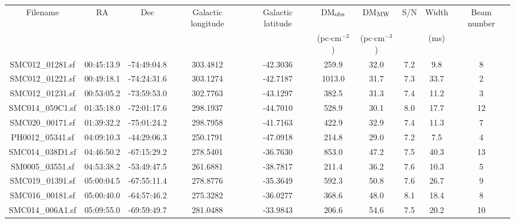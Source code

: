 \documentclass[fleqn,usenatbib]{mnras}
\begin{document}
\begin{table}
\begin{scriptsize}
\begin{center}
\begin{tabular}{@{\extracolsep{\fill}}c|c|c|c|c|c|c|c|c|c}
\multicolumn{1}{c|}{Filename}  &    RA      &  Dec        &     Galactic longitude   	 &     	Galactic latitude        &    DM$_{\rm obs}$        &     DM$_{\rm MW}$       &      S/N       &       	Width         &           Beam number      \\
 \multicolumn{1}{c|}{}            &            &             &                       	     &                                 &     (pc$\cdot$cm$^{-3}$)       &    (pc$\cdot$cm$^{-3}$)        &             &       	(ms)         &                  \\
 \hline
  SMC012\_01281.sf    &   00:45:13.9  &   -74:49:04.8   &    303.4812    &    -42.3036    &    259.9    &    32.0    &    7.2    &    9.8    &    8    \\ 
  SMC012\_01221.sf    &   00:49:18.1  &   -74:24:31.6   &    303.1274    &    -42.7187    &    1013.0    &    31.7    &    7.3    &    33.7    &    2    \\ 
  SMC012\_01231.sf    &   00:53:05.2  &   -73:59:53.0   &    302.7763    &    -43.1297    &    382.5    &    31.3    &    7.4    &    11.2    &    3    \\ 
  SMC014\_059C1.sf    &   01:35:18.0  &   -72:01:17.6   &    298.1937    &    -44.7010    &    528.9    &    30.1    &    8.0    &    17.7    &    12    \\ 
  SMC020\_00171.sf    &   01:39:32.2  &   -75:01:24.2   &    298.7958    &    -41.7163    &    422.9    &    32.9    &    7.4    &    11.3    &    7    \\ 
  PH0012\_05341.sf    &   04:09:10.3  &   -44:29:06.3   &    250.1791    &    -47.0918    &    214.8    &    29.0    &    7.2    &    7.5    &    4    \\ 
  SMC014\_038D1.sf    &   04:46:50.2  &   -67:15:29.2   &    278.5401    &    -36.7630    &    853.0    &    47.2    &    7.5    &    40.3    &    13    \\ 
  SM0005\_03551.sf    &   04:53:38.2  &   -53:49:47.5   &    261.6881    &    -38.7817    &    211.4    &    36.2    &    7.6    &    10.3    &    5    \\ 
  SMC019\_01391.sf    &   05:00:04.5  &   -67:55:11.4   &    278.8776    &    -35.3649    &    592.3    &    50.8    &    7.6    &    26.7    &    9    \\ 
  SMC016\_00181.sf    &   05:00:40.0  &   -64:57:46.2   &    275.3282    &    -36.0277    &    368.6    &    48.0    &    8.1    &    18.4    &    8    \\ 
  SMC014\_006A1.sf    &   05:09:55.0  &   -69:59:49.7   &    281.0488    &    -33.9843    &    206.6    &    54.6    &    7.5    &    20.2    &    10    \\ 

\end{tabular}
\end{center}
\end{scriptsize}
\end{table}
\end{document}

